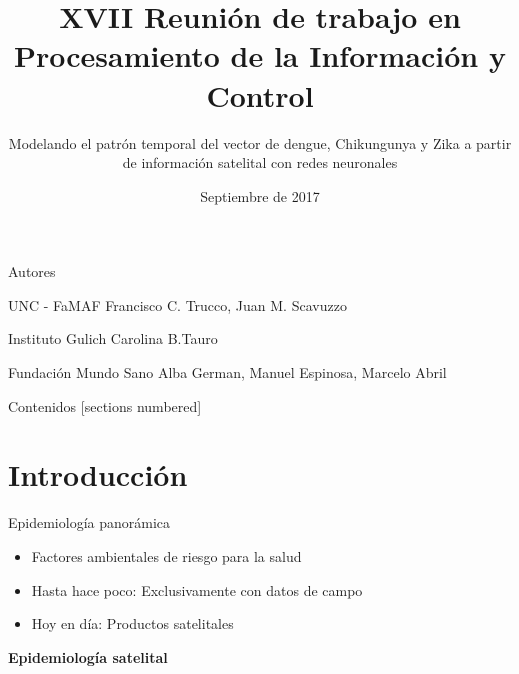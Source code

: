 \documentclass[10pt]{beamer}
\title{XVII Reunión de trabajo en Procesamiento de la Información y Control}
\subtitle{Modelando el patrón temporal del vector de dengue, Chikungunya y Zika
  a partir de información satelital con redes neuronales}
\date{Septiembre de 2017}
\begin{document}
\maketitle

\begin{frame}{Autores}
	\begin{alertblock}{UNC - FaMAF}
    Francisco C. Trucco, Juan M. Scavuzzo
	\end{alertblock}

	\begin{alertblock}{Instituto Gulich}
    Carolina B.Tauro
	\end{alertblock}

	\begin{alertblock}{Fundación Mundo Sano}
    Alba German, Manuel Espinosa, Marcelo Abril
	\end{alertblock}
\end{frame}

\begin{frame}{Contenidos}
  [sections numbered]
  \tableofcontents[hideallsubsections]
\end{frame}

\section{Introducción}

\begin{frame}{Epidemiología panorámica}

  \begin{itemize}
  \item Factores ambientales de riesgo para la salud
  \item Hasta hace poco: Exclusivamente con datos de campo
  \item Hoy en día: Productos satelitales
  \end{itemize}

  \begin{center}
    \textbf{Epidemiología satelital}
  \end{center}

\end{frame}
\end{document}
